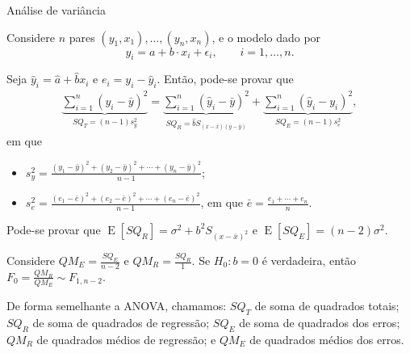 \documentclass[8pt]{beamer}
\DeclareMathOperator{\espe}{E}
\begin{document}
\begin{frame}{Análise de variância}

Considere $n$ pares $(y_1, x_1), \dots, (y_n, x_n)$, e o modelo dado por
$$y_i = a + b \cdot x_i + \epsilon_i, \qquad i =1, \dots, n.$$

Seja $\hat{y}_i = \hat{a} + \hat{b} x_i$ e $e_i = y_i - \hat{y}_i$. Então, pode-se provar que
\begin{align*}
\underbrace{\sum_{i=1}^{n} (y_i - \bar{y})^2} _{SQ_T = (n-1)s^2_y} = \underbrace{\sum_{i=1}^{n} (\hat{y}_i - \bar{y})^2 }_{SQ_R =\hat{b} S_{(x-\bar{x})(y - \bar{y})}} + \underbrace{\sum_{i=1}^{n} (\hat{y}_i - y_i)^2 }_{SQ_E = (n-1)s_e^2},
\end{align*}
em que 
\begin{itemize}
	\item $s^2_y = \frac{(y_1-\bar{y})^2 + (y_2-\bar{y})^2 + \cdots + (y_n-\bar{y})^2}{n-1}$;
	\item $s^2_e = \frac{(e_1-\bar{e})^2 + (e_2-\bar{e})^2 + \cdots + (e_n-\bar{e})^2}{n-1}$,  em que $\bar{e} = \frac{e_1 + \cdots + e_n}{n}$.
\end{itemize}

Pode-se provar que $\espe\left[SQ_R\right] = \sigma^2 + b^2 S_{(x-\bar{x})^2}$ e $\espe\left[ SQ_E \right] = (n-2)\sigma^2$. 

Considere $QM_E = \frac{SQ_E}{n-2}$ e $QM_R = \frac{SQ_R}{1}$. Se $H_0: b = 0$ é verdadeira, então $F_0 = \frac{QM_R}{QM_E} \sim F_{1, n-2}$.

De forma semelhante a ANOVA, chamamos: $SQ_T$ de soma de quadrados totais; $SQ_R$ de soma de quadrados de regressão; $SQ_E$ de soma de quadrados dos erros; $QM_R$ de quadrados médios de regressão; e $QM_E$ de quadrados médios dos erros.

\end{frame}
\end{document}
